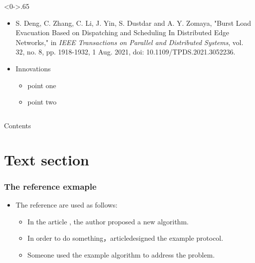 \documentclass{beamer}%
\begin{document}
\begin{frame}
\begin{columns}[T]
		\hfill%
		\begin{column}<0->{.65\textwidth}
			\begin{itemize}
				\item<1-> S. Deng, C. Zhang, C. Li, J. Yin, S. Dustdar and A. Y. Zomaya, "Burst Load Evacuation Based on Dispatching and Scheduling In Distributed Edge Networks," in \emph{IEEE Transactions on Parallel and Distributed Systems}, vol. 32, no. 8, pp. 1918-1932, 1 Aug. 2021, doi: 10.1109/TPDS.2021.3052236.
				\item<1-> Innovations
				      \begin{itemize}
					      \item<1->point one
					      \item<1->point two
				      \end{itemize}
			\end{itemize}
		\end{column}%
	\end{columns}
\end{frame}





\begin{frame}{Contents}  %
	\tableofcontents 
\end{frame}


\section{Text section}

\begin{frame}
	\frametitle{The reference exmaple}
	\begin{itemize}
		\item<1-> The reference are used as follows:
		      \begin{itemize}
			      \item<1->In the article , the author proposed a new algorithm.
			      \item<1->In order to do something，articledesigned the example protocol.
			      \item<1->Someone used the example algorithm to address the problem.
		      \end{itemize}
	\end{itemize}
\end{frame}
\end{document}
